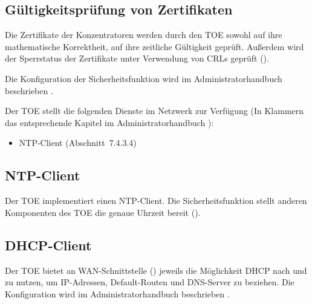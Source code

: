 \subsection{Gültigkeitsprüfung von Zertifikaten}\label{sf.vpn.certverification}

Die Zertifikate der Konzentratoren werden durch den TOE sowohl auf ihre
mathematische Korrektheit, auf ihre zeitliche Gültigkeit geprüft. Außerdem wird
der Sperrstatus der Zertifikate unter Verwendung von CRLs geprüft
().




Die Konfiguration der Sicherheitsfunktion wird im Administratorhandbuch
beschrieben \autocite[Abschnitt~7.4]{agd_adm}.

\sfbeschreibung{}

Der TOE stellt die folgenden Dienste im Netzwerk zur Verfügung (In Klammern das
entsprechende Kapitel im Administratorhandbuch \autocite{agd_adm}):

\begin{itemize}
\item NTP-Client (Abschnitt~7.4.3.4)
\end{itemize}

\hypertarget{sf.networkservices.ntp}{\subsection{NTP-Client}\label{sf.networkservices.ntp}}

Der TOE implementiert einen NTP-Client. Die Sicherheitsfunktion
 stellt anderen Komponenten des TOE
die genaue Uhrzeit bereit ().

\subsection{DHCP-Client}\label{sf.networkservices.dhcpclient}

Der TOE bietet an WAN-Schnittstelle (\lswandhcp{}) jeweils die Möglichkeit
DHCP nach  und  zu nutzen, um IP-Adressen,
Default-Routen und DNS-Server zu beziehen. Die Konfiguration wird im
Administratorhandbuch beschrieben \autocite{agd_adm}.



